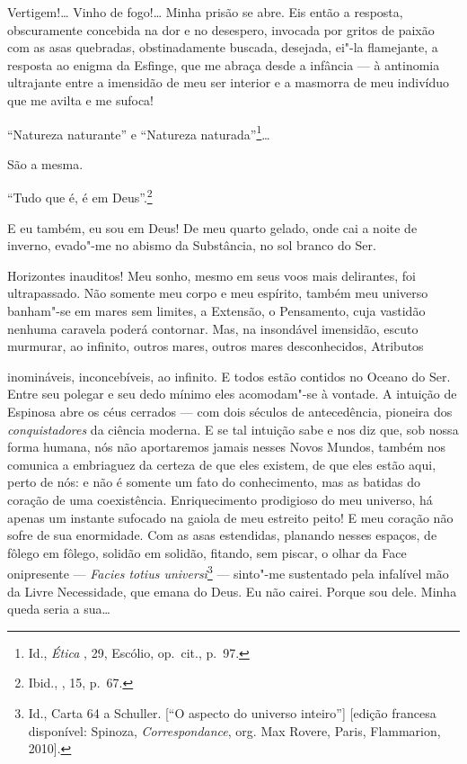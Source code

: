 Vertigem!\ldots{} Vinho de fogo!\ldots{} Minha prisão se abre. Eis então a
resposta, obscuramente concebida na dor e no desespero, invocada por
gritos de paixão com as asas quebradas, obstinadamente buscada,
desejada, ei"-la flamejante, a resposta ao enigma da Esfinge, que me
abraça desde a infância --- à antinomia ultrajante entre a imensidão de
meu ser interior e a masmorra de meu indivíduo que me avilta e me
sufoca!

``Natureza naturante'' e ``Natureza naturada''\footnote{Id.,
  \emph{Ética} , 29, Escólio, op.~cit., p.~97.}\ldots{}

São a mesma.

``Tudo que é, é em Deus''.\footnote{Ibid., , 15, p.~67.}

E eu também, eu sou em Deus! De meu quarto gelado, onde cai a noite de
inverno, evado"-me no abismo da Substância, no sol branco do Ser.

Horizontes inauditos! Meu sonho, mesmo em seus voos mais delirantes, foi
ultrapassado. Não somente meu corpo e meu espírito, também meu universo
banham"-se em mares sem limites, a Extensão, o Pensamento, cuja vastidão
nenhuma caravela poderá contornar. Mas, na insondável imensidão, escuto
murmurar, ao infinito, outros mares, outros mares desconhecidos,
Atributos \linebreak

\quebra

\noindent{}inomináveis, inconcebíveis, ao infinito. E todos estão
contidos no Oceano do Ser. Entre seu polegar e seu dedo mínimo eles
acomodam"-se à vontade. A intuição de Espinosa abre os céus cerrados ---
com dois séculos de antecedência, pioneira dos \emph{conquistadores} da
ciência moderna. E se tal intuição sabe e nos diz que, sob nossa forma
humana, nós não aportaremos jamais nesses Novos Mundos, também nos
comunica a embriaguez da certeza de que eles existem, de que eles estão
aqui, perto de nós: e não é somente um fato do conhecimento, mas as
batidas do coração de uma coexistência. Enriquecimento prodigioso do meu
universo, há apenas um instante sufocado na gaiola de meu estreito
peito! E meu coração não sofre de sua enormidade. Com as asas
estendidas, planando nesses espaços, de fôlego em fôlego, solidão em
solidão, fitando, sem piscar, o olhar da Face onipresente ---
\emph{Facies totius universi}\footnote{Id., Carta 64 a Schuller. {[}``O
  aspecto do universo inteiro''{]} {[}edição francesa disponível:
  Spinoza, \emph{Correspondance}, org. Max Rovere, Paris,  Flammarion,
  2010{]}.} --- sinto"-me sustentado pela infalível mão da Livre
Necessidade, que emana do Deus. Eu não cairei. Porque sou dele. Minha
queda seria a sua\ldots{}

